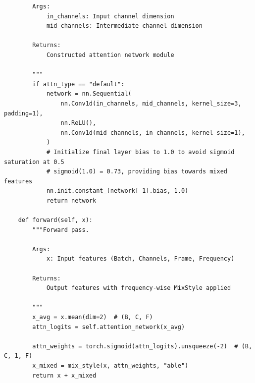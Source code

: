 \documentclass[../main.tex]{subfiles}
\begin{document}
\begin{verbatim}
        Args:
            in_channels: Input channel dimension
            mid_channels: Intermediate channel dimension

        Returns:
            Constructed attention network module

        """
        if attn_type == "default":
            network = nn.Sequential(
                nn.Conv1d(in_channels, mid_channels, kernel_size=3, padding=1),
                nn.ReLU(),
                nn.Conv1d(mid_channels, in_channels, kernel_size=1),
            )
            # Initialize final layer bias to 1.0 to avoid sigmoid saturation at 0.5
            # sigmoid(1.0) = 0.73, providing bias towards mixed features
            nn.init.constant_(network[-1].bias, 1.0)
            return network

    def forward(self, x):
        """Forward pass.

        Args:
            x: Input features (Batch, Channels, Frame, Frequency)

        Returns:
            Output features with frequency-wise MixStyle applied

        """
        x_avg = x.mean(dim=2)  # (B, C, F)
        attn_logits = self.attention_network(x_avg)

        attn_weights = torch.sigmoid(attn_logits).unsqueeze(-2)  # (B, C, 1, F)
        x_mixed = mix_style(x, attn_weights, "able")
        return x + x_mixed
\end{verbatim}
\end{document}
